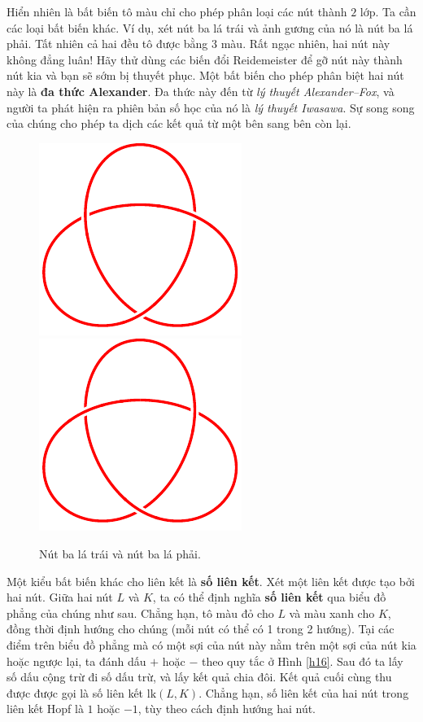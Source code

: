 \documentclass[12pt]{article}
\begin{document}
Hiển nhiên là bất biến tô màu chỉ cho phép phân loại các nút thành $2$ lớp. Ta cần các loại bất biến khác. Ví dụ, xét nút ba lá trái và ảnh gương của nó là nút ba lá phải. Tất nhiên cả hai đều tô được bằng $3$ màu. Rất ngạc nhiên, hai nút này không đẳng luân! Hãy thử dùng các biến đổi Reidemeister để gỡ nút này thành nút kia và bạn sẽ sớm bị thuyết phục. Một bất biến cho phép phân biệt hai nút này là {\bf đa thức Alexander}. Đa thức này đến từ {\it lý thuyết Alexander--Fox}, và người ta phát hiện ra phiên bản số học của nó là {\it lý thuyết Iwasawa}. Sự song song của chúng cho phép ta dịch các kết quả từ một bên sang bên còn lại.
\begin{figure}[h!]
    \centering
    \includegraphics[scale = 1]{trefoil.pdf}
    \hspace{2cm}
    \includegraphics[scale = 1]{mirror trefoil.pdf}
    \caption{Nút ba lá trái và nút ba lá phải.}
    \label{h15}
\end{figure}

Một kiểu bất biến khác cho liên kết là {\bf số liên kết}. Xét một liên kết được tạo bởi hai nút. Giữa hai nút $L$ và $K$, ta có thể định nghĩa {\bf số liên kết} qua biểu đồ phẳng của chúng như sau. Chẳng hạn, tô màu đỏ cho $L$ và màu xanh cho $K$, đồng thời định hướng cho chúng (mỗi nút có thể có 1 trong 2 hướng). Tại các điểm trên biểu đồ phẳng mà có một sợi của nút này nằm trên một sợi của nút kia hoặc ngược lại, ta đánh dấu $+$ hoặc $-$ theo quy tắc ở Hình \ref{h16}. Sau đó ta lấy số dấu cộng trừ đi số dấu trừ, và lấy kết quả chia đôi. Kết quả cuối cùng thu được được gọi là số liên kết $\text{lk}(L,K)$. Chẳng hạn, số liên kết của hai nút trong liên kết Hopf là $1$ hoặc $-1$, tùy theo cách định hướng hai nút.
\end{document}
